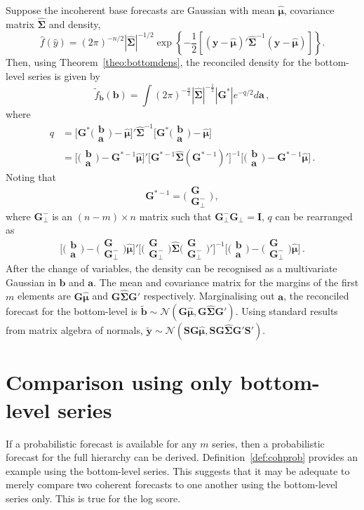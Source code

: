 \documentclass[a4paper,12pt]{article}
\def\PQ{\bigg(\begin{matrix}\bm{G}\\[-0.2cm]\bm{G}_{\perp}^-\end{matrix}\bigg)}
\def\bt{\bigg(\begin{matrix}\bm{b}\\[-0.2cm]\bm{a}\end{matrix}\bigg)}
\theoremstyle{definition}
\begin{document}
Suppose the incoherent base forecasts are Gaussian with mean $\hat{\bm{\mu}}$, covariance matrix $\hat{\bm{\Sigma}}$ and density,
\begin{equation}
\hat{f}(\hat{y})=(2\pi)^{-n/2}|\hat{\bm{\Sigma}}|^{-1/2}\exp\left\{-\frac{1}{2}\left[({\bm{y}}-\hat{\bm{\mu}})'\hat{\bm{\Sigma}}^{-1}({\bm{y}}-\hat{\bm{\mu}})\right]\right\}\nonumber.
\end{equation}
Then, using Theorem~\ref{theo:bottomdens}, the reconciled density for the bottom-level series is given by
\begin{equation}
\tilde{f}_{\bm{b}}(\bm{b})=\int(2\pi)^{-\frac{n}{2}}|\hat{\bm{\Sigma}}|^{-\frac{1}{2}}|\bm{G}^*|e^{-q/2} d\bm{a}\nonumber\,,
\end{equation}
where
\begin{align*}
q& =
\bigg[\bm{G}^*\bt-\hat{\bm{\mu}}\bigg]' \hat{\bm{\Sigma}}^{-1}\bigg[\bm{G}^*\bt-\hat{\bm{\mu}}\bigg]\\
& =
\bigg[\bt-\bm{G}^{*-1}\hat{\bm{\mu}}\bigg]'
\bigg[\bm{G}^{*-1}\hat{\bm{\Sigma}}(\bm{G}^{*-1})'\bigg]^{-1}
\bigg[\bt-\bm{G}^{*-1}\hat{\bm{\mu}}\bigg]\,.
\end{align*}
Noting that
\[
\bm{G}^{*-1}=\Bigg(\begin{matrix}
\bm{G} \\\bm{G}_{\perp}^-
\end{matrix}\Bigg)\,,
\]
where $\bm{G}_{\perp}^-$ is an $(n-m)\times n$ matrix such that $\bm{G}_{\perp}^-\bm{G}_{\perp}=\bm{I}$, $q$ can be rearranged as
\[
\bigg[\bt-\PQ\hat{\bm{\mu}}\bigg]'
\bigg[\PQ\hat{\bm{\Sigma}}\PQ'\bigg]^{-1}
\bigg[\bt-\PQ\hat{\bm{\mu}}\bigg]\,.
\]
After the change of variables, the density can be recognised as a multivariate Gaussian in $\bm{b}$ and $\bm{a}$. The mean and covariance matrix for the margins of the first $m$ elements are $\bm{G}\hat{\bm{\mu}}$ and $\bm{G}\hat{\bm{\Sigma}}\bm{G}'$ respectively. Marginalising out $\bm{a}$, the reconciled forecast for the bottom-level is $\tilde{\bm{b}} \sim \mathcal{N}(\bm{G}\hat{\bm{\mu}}, \bm{G}\hat{\bm{\Sigma}}\bm{G}')$. Using standard results from matrix algebra of normals, $\tilde{\bm{y}} \sim \mathcal{N}(\bm{S}\bm{G}\hat{\bm{\mu}}, \bm{S}\bm{G}\hat{\bm{\Sigma}}\bm{G}'\bm{S}')$.

\section{Comparison using only bottom-level series}\label{app:bl_comp}

If a probabilistic forecast is available for any $m$ series, then a probabilistic forecast for the full hierarchy can be derived. Definition~\ref{def:cohprob} provides an example using the bottom-level series. This suggests that it may be adequate to merely compare two coherent forecasts to one another using the bottom-level series only. This is true for the log score.
\end{document}
